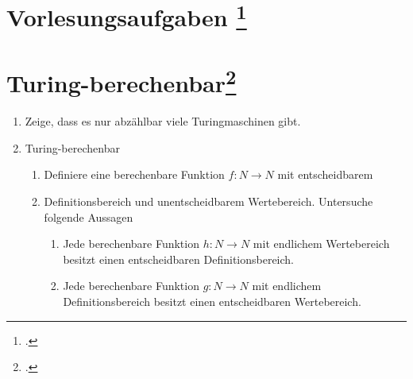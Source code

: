 \documentclass{bschlangaul-aufgabe}
\begin{document}

\section{Vorlesungsaufgaben
\footcite{theo:fs:4}}

\section{Turing-berechenbar\footcite[Seite 29]{theo:fs:4}}

\begin{enumerate}
\item Zeige, dass es nur abzählbar viele Turingmaschinen gibt.

\item Turing-berechenbar

\begin{enumerate}
\item Definiere eine berechenbare Funktion $f: N \rightarrow N$ mit
entscheidbarem

\item Definitionsbereich und unentscheidbarem Wertebereich. Untersuche
folgende Aussagen

\begin{enumerate}

\item Jede berechenbare Funktion $h: N \rightarrow N$ mit endlichem
Wertebereich besitzt einen entscheidbaren Definitionsbereich.

\item Jede berechenbare Funktion $g: N \rightarrow N$ mit endlichem
Definitionsbereich besitzt einen entscheidbaren Wertebereich.
\end{enumerate}
\end{enumerate}
\end{enumerate}
\end{document}

